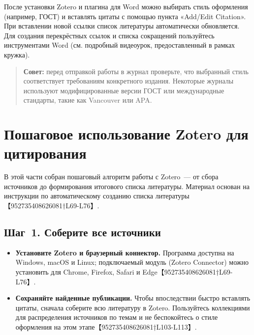 \documentclass[
  russian,
  letterpaper,
]{book}
\providecommand{\tightlist}{%
  \setlength{\itemsep}{0pt}\setlength{\parskip}{0pt}}
\begin{document}
После установки Zotero и плагина для Word можно выбирать стиль
оформления (например, ГОСТ) и вставлять цитаты с помощью пункта
«Add/Edit Citation». При вставлении новой ссылки список литературы
автоматически обновляется. Для создания перекрёстных ссылок и списка
сокращений пользуйтесь инструментами Word (см. подробный видеоурок,
предоставленный в рамках кружка).

\begin{quote}
\textbf{Совет:} перед отправкой работы в журнал проверьте, что выбранный
стиль соответствует требованиям конкретного издания. Некоторые журналы
используют модифицированные версии ГОСТ или международные стандарты,
такие как Vancouver или APA.
\end{quote}

\section{Пошаговое использование Zotero для
цитирования}\label{ux43fux43eux448ux430ux433ux43eux432ux43eux435-ux438ux441ux43fux43eux43bux44cux437ux43eux432ux430ux43dux438ux435-zotero-ux434ux43bux44f-ux446ux438ux442ux438ux440ux43eux432ux430ux43dux438ux44f}

В этой части собран пошаговый алгоритм работы с Zotero~--- от сбора
источников до формирования итогового списка литературы. Материал основан
на инструкции по автоматическому созданию списка литературы
【952735408626081†L69-L76】.

\subsection{Шаг~1. Соберите все
источники}\label{ux448ux430ux433-1.-ux441ux43eux431ux435ux440ux438ux442ux435-ux432ux441ux435-ux438ux441ux442ux43eux447ux43dux438ux43aux438}

\begin{itemize}
\tightlist
\item
  \textbf{Установите Zotero и браузерный коннектор.} Программа доступна
  на Windows, macOS и Linux; подключаемый модуль (Zotero Connector)
  можно установить для Chrome, Firefox, Safari и
  Edge【952735408626081†L69-L76】.
\item
  \textbf{Сохраняйте найденные публикации.} Чтобы впоследствии быстро
  вставлять цитаты, сначала соберите всю литературу в Zotero.
  Пользуйтесь коллекциями для распределения источников по темам и не
  беспокойтесь о стиле оформления на этом
  этапе【952735408626081†L103-L113】.
\end{itemize}
\end{document}
